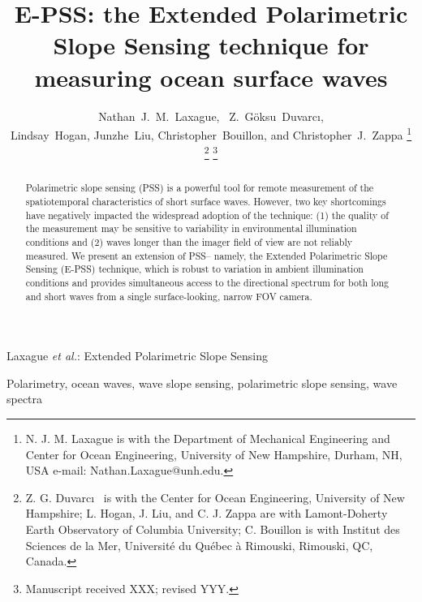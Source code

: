\documentclass[letterpaper,draftcls,onecolumn]{IEEEtran}
\begin{document}
%
\title{E-PSS: the Extended Polarimetric Slope Sensing technique for measuring ocean surface waves}

\author{Nathan~J.~M.~Laxague,~
	Z.~G\"oksu~Duvarc\i,\\
	Lindsay~Hogan, Junzhe~Liu,
	Christopher~Bouillon, and Christopher~J.~Zappa%
	\thanks{N. J. M. Laxague is with the Department
		of Mechanical Engineering and Center for Ocean Engineering, University of New Hampshire, Durham, NH, USA e-mail: Nathan.Laxague@unh.edu.}%
	\thanks{Z. G. Duvarc\i~ is with the Center for Ocean Engineering, University of New Hampshire; L. Hogan, J. Liu, and C. J. Zappa are with Lamont-Doherty Earth Observatory of Columbia University; C. Bouillon is with Institut des Sciences de la Mer, Université du Québec à Rimouski, Rimouski, QC, Canada.}%
	\thanks{Manuscript received XXX; revised YYY.}}

%
{Laxague \MakeLowercase{\textit{et al.}}: Extended Polarimetric Slope Sensing}

\maketitle

\begin{abstract}
	Polarimetric slope sensing (PSS) is a powerful tool for remote measurement of the spatiotemporal characteristics of short surface waves. However, two key shortcomings have negatively impacted the widespread adoption of the technique: (1) the quality of the measurement may be sensitive to variability in environmental illumination conditions and (2) waves longer than the imager field of view are not reliably measured. We present an extension of PSS-- namely, the Extended Polarimetric Slope Sensing (E-PSS) technique, which is robust to variation in ambient illumination conditions and provides simultaneous access to the directional spectrum for both long and short waves from a single surface-looking, narrow FOV camera. 
\end{abstract}

\begin{IEEEkeywords}
	Polarimetry, ocean waves, wave slope sensing, polarimetric slope sensing, wave spectra
\end{IEEEkeywords}
\end{document}
